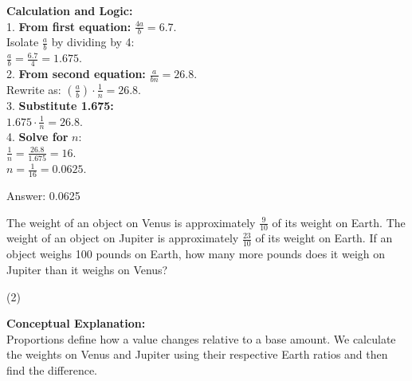 \documentclass[11pt,paper=a4,answers]{exam}
\begin{document}
\begin{questions}
\begin{solution}
\vspace{30pt}

\textbf{Calculation and Logic:} \\
1. \textbf{From first equation:} $\frac{4a}{b} = 6.7$. \\
Isolate $\frac{a}{b}$ by dividing by 4: \\
$\frac{a}{b} = \frac{6.7}{4} = 1.675$. \\
2. \textbf{From second equation:} $\frac{a}{bn} = 26.8$. \\
Rewrite as: $\left( \frac{a}{b} \right) \cdot \frac{1}{n} = 26.8$. \\
3. \textbf{Substitute 1.675:} \\
$1.675 \cdot \frac{1}{n} = 26.8$. \\
4. \textbf{Solve for } $n$: \\
$\frac{1}{n} = \frac{26.8}{1.675} = 16$. \\
$n = \frac{1}{16} = 0.0625$.

\vspace{30pt}

Answer: \colorbox{yellow!100}{0.0625}
\end{solution}

\vspace{60pt}

\question
The weight of an object on Venus is approximately $\frac{9}{10}$ of its weight on Earth. The weight of an object on Jupiter is approximately $\frac{23}{10}$ of its weight on Earth. If an object weighs 100 pounds on Earth, how many more pounds does it weigh on Jupiter than it weighs on Venus?
\begin{tasks}(2)
\end{tasks}

\begin{solution}
\textbf{Conceptual Explanation:} \\
Proportions define how a value changes relative to a base amount. We calculate the weights on Venus and Jupiter using their respective Earth ratios and then find the difference.

\vspace{30pt}
\begin{center}
\end{center}
\vspace{30pt}


\end{solution}
\end{questions}
\end{document}

